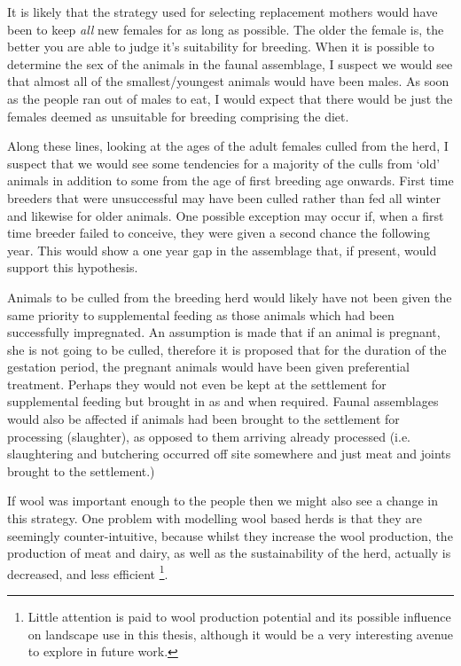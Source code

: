 It is likely that the strategy used for selecting replacement mothers would have been to keep \emph{all} new females for as long as possible.  The older the female is, the better you are able to judge it's suitability for breeding.  When it is possible to determine the sex of the animals in the faunal assemblage, I suspect we would see that almost all of the smallest/youngest animals would have been males.  As soon as the people ran out of males to eat, I would expect that there would be just the females deemed as unsuitable for breeding comprising the diet. %

Along these lines, looking at the ages of the adult females culled from the herd, I suspect that we would see some tendencies for a majority of the culls from `old' animals in addition to some from the age of first breeding age onwards.  First time breeders that were unsuccessful may have been culled rather than fed all winter and likewise for older animals.  One possible exception may occur if, when a first time breeder failed to conceive, they were given a second chance the following year.  This would show a one year gap in the assemblage that, if present, would support this hypothesis. %

Animals to be culled from the breeding herd would likely have not been given the same priority to supplemental feeding as those animals which had been successfully impregnated. %
An assumption is made that if an animal is pregnant, she is not going to be culled, therefore it is proposed that for the duration of the gestation period, the pregnant animals would have been given preferential treatment.  Perhaps they would not even be kept at the settlement for supplemental feeding but brought in as and when required.  Faunal assemblages would also be affected if animals had been brought to the settlement for processing (slaughter), as opposed to them arriving already processed (i.e. slaughtering and butchering occurred off site somewhere and just meat and joints brought to the settlement.) %

If wool was important enough to the people then we might also see a change in this strategy.  One problem with modelling wool based herds is that they are seemingly counter-intuitive, because whilst they increase the wool production, the production of meat and dairy, as well as the sustainability of the herd, actually is decreased, and less efficient \citep{Munson2000}\footnote{Little attention is paid to wool production potential and its possible influence on landscape use in this thesis, although it would be a very interesting avenue to explore in future work.}.

